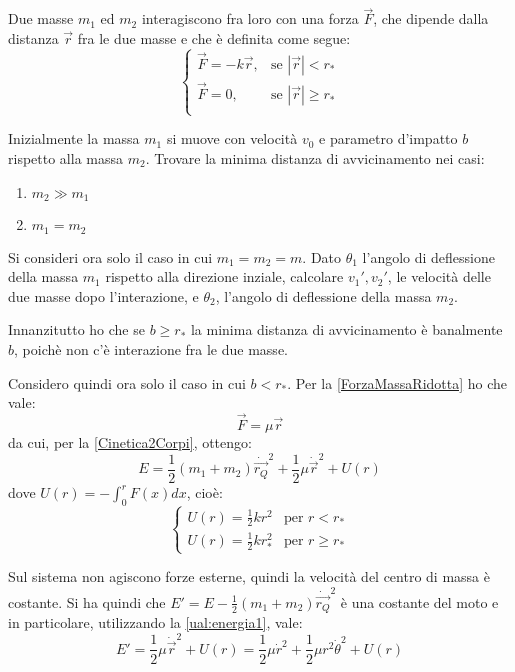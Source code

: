 \documentclass[../main.tex]{subfiles}
\begin{document}
\textex
Due masse $m_1$ ed $m_2$ interagiscono fra loro con una forza $\vec F$, che dipende dalla distanza $\vec r$ fra le due masse e che è definita come segue:
\begin{equation*}
\begin{cases}
	\vec F=-k\vec r, &\mbox{se } |\vec r|<r_*\\
	\vec F=0, & \mbox{se } |\vec r|\ge r_*\\
\end{cases}
\end{equation*}

Inizialmente la massa $m_1$ si muove con velocità $v_0$ e parametro d'impatto $b$ rispetto alla massa $m_2$.
Trovare la minima distanza di avvicinamento nei casi:
\begin{enumerate}
	\item $m_2\gg m_1$
	\item $m_1=m_2$
\end{enumerate}

Si consideri ora solo il caso in cui $m_1=m_2=m$. Dato $\theta_1$ l'angolo di deflessione della massa $m_1$ rispetto alla direzione inziale, calcolare $v_1',v_2'$, le velocità delle due masse dopo l'interazione, e $\theta_2$, l'angolo di deflessione della massa $m_2$.

\solution
Innanzitutto ho che se $b\ge r_*$ la minima distanza di avvicinamento è banalmente $b$, poichè non c'è interazione fra le due masse.

Considero quindi ora solo il caso in cui $b<r_*$. 
Per la \cref{ForzaMassaRidotta} ho che vale:
\begin{equation*}
	\vec F=\mu \vec r
\end{equation*}
da cui, per la \cref{Cinetica2Corpi}, ottengo:
\begin{equation}\label{ual:energia1}
	E=\frac12(m_1+m_2)\dot{\overrightarrow{r_Q}}^2+\frac12\mu\dot{\vec{r}}^2+U(r)
\end{equation}
dove $U(r)=-\int_{0}^r F(x) dx$, cioè:
\begin{equation*}
	\begin{cases}
		U(r)=\frac12kr^2 &\mbox{per } r<r_*\\
		U(r)=\frac12kr_*^2 &\mbox{per } r\ge r_*
	\end{cases}
\end{equation*}

Sul sistema non agiscono forze esterne, quindi la velocità del centro di massa è costante.
Si ha quindi che $E'=E-\frac12(m_1+m_2)\dot{\overrightarrow{r_Q}}^2$ è una costante del moto e in particolare, utilizzando la \cref{ual:energia1}, vale:
\begin{equation}\label{ual:energia2}
	E'=\frac12\mu\dot{\vec{r}}^2+U(r)=\frac12\mu\dot r^2+\frac12\mu r^2\dot \theta^2+U(r)
\end{equation}
\end{document}
